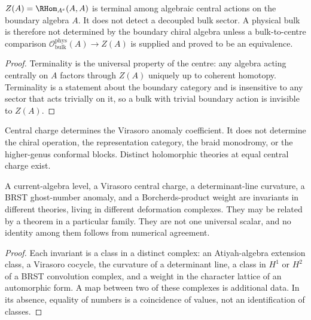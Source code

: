 \begin{theorem}
\label{nogo:bulk}
\StatusProved{} $Z(A)=\RHom_{A^e}(A,A)$ is terminal among algebraic
central actions on the boundary algebra $A$. It does not detect a
decoupled bulk sector. A physical bulk is therefore not determined by the
boundary chiral algebra unless a bulk-to-centre comparison
$\mathcal O^{\mathrm{phys}}_{\mathrm{bulk}}(A)\to Z(A)$ is supplied and
proved to be an equivalence.
\end{theorem}

\begin{proof}
Terminality is the universal property of the centre: any algebra acting
centrally on $A$ factors through $Z(A)$ uniquely up to coherent homotopy.
Terminality is a statement about the boundary category and is insensitive
to any sector that acts trivially on it, so a bulk with trivial boundary
action is invisible to $Z(A)$.
\end{proof}

\begin{theorem}
\label{nogo:central-charge}
\StatusProved{} Central charge determines the Virasoro anomaly
coefficient. It does not determine the chiral operation, the
representation category, the braid monodromy, or the higher-genus
conformal blocks. Distinct holomorphic theories at equal central charge
exist.
\end{theorem}

\begin{theorem}
\label{nogo:anomaly-types}
\StatusProved{} A current-algebra level, a Virasoro central charge, a
determinant-line curvature, a BRST ghost-number anomaly, and a
Borcherds-product weight are invariants in different theories, living in
different deformation complexes. They may be related by a theorem in a
particular family. They are not one universal scalar, and no identity
among them follows from numerical agreement.
\end{theorem}

\begin{proof}
Each invariant is a class in a distinct complex: an Atiyah-algebra
extension class, a Virasoro cocycle, the curvature of a determinant line,
a class in $H^1$ or $H^2$ of a BRST convolution complex, and a weight in
the character lattice of an automorphic form. A map between two of these
complexes is additional data. In its absence, equality of numbers is a
coincidence of values, not an identification of classes.
\end{proof}

